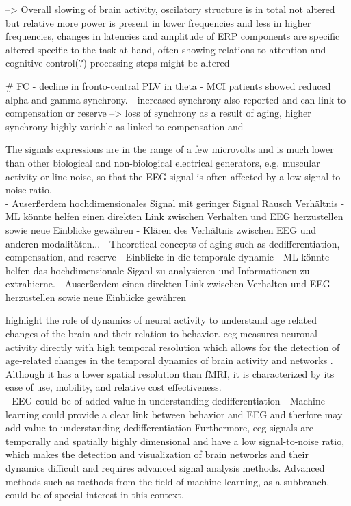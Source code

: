 --> Overall slowing of brain activity, oscilatory structure is in total not altered but relative more power is present in lower frequencies and less in higher frequencies, changes in latencies and amplitude of ERP components are specific altered specific to the task at hand, often showing relations to attention and cognitive control(?) processing steps might be altered 

# FC 
- decline in fronto-central PLV in theta
- MCI patients showed reduced alpha and gamma synchrony.
- increased synchrony also reported and can link to compensation or reserve 
--> loss of synchrony as a result of aging, higher synchrony highly variable as linked to compensation and 


The signals expressions are in the range of a few microvolts and is much lower than other biological and non-biological electrical generators, e.g. muscular activity or line noise, so that the EEG signal is often affected by a low signal-to-noise ratio.\\
- Auserßerdem hochdimensionales Signal mit geringer Signal Rausch Verhältnis 
- ML könnte helfen einen direkten Link zwischen Verhalten und EEG herzustellen sowie neue Einblicke gewähren 
- Klären des Verhältnis zwischen EEG und anderen modalitäten... 
- Theoretical concepts of aging such as dedifferentiation, compensation, and reserve
- Einblicke in die temporale dynamic 
- ML könnte helfen das hochdimensionale Siganl zu analysieren und Informationen zu extrahierne. 
- Auserßerdem einen direkten Link zwischen Verhalten und EEG herzustellen sowie neue Einblicke gewähren 




\citeauthor{Courtney2021} \cite{Courtney2021} highlight the role of dynamics of neural activity to understand age related changes of the brain and their relation to behavior. \Gls{eeg} measures neuronal activity directly with high temporal resolution which allows for the detection of age-related changes in the temporal dynamics of brain activity and networks \cite{Courtney2021}. Although it has a lower spatial resolution than fMRI, it is characterized by its ease of use, mobility, and relative cost effectiveness. \\



- EEG could be of added value in understanding dedifferentiation
- Machine learning could provide a clear link between behavior and EEG and therfore may add value to understanding dedifferentiation 
 Furthermore, \gls{eeg} signals are temporally and spatially highly dimensional and have a low signal-to-noise ratio, which makes the detection and visualization of brain networks and their dynamics difficult and requires advanced signal analysis methods. Advanced methods such as methods from the field of machine learning, as a subbranch, could be of special interest in this context.\\


